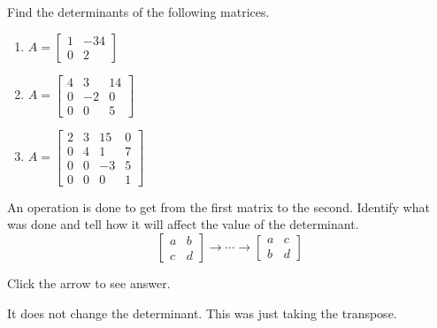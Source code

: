 \documentclass{ximera}
\begin{document}
\begin{problem}\label{prb:7.8} Find the determinants of the following matrices.

\begin{enumerate}
\item
$A = \left[ \begin{array}{rr}
1 & -34 \\
0 & 2
\end{array} \right] $

\item
$A = \left[ \begin{array}{rrr}
4 & 3 & 14 \\
 0 & -2 & 0 \\
0 & 0 & 5
\end{array} \right]$

\item
$A = \left[ \begin{array}{rrrr}
2 & 3 & 15 & 0 \\
0 & 4 & 1 & 7 \\
0 & 0 & -3 & 5 \\
0 & 0 & 0 & 1
\end{array} \right]$
\end{enumerate}


\end{problem}

\begin{problem}\label{prb:7.9} An operation is done to get from the first matrix to the second.
Identify what was done and tell how it will affect the value of the
determinant.
\begin{equation*}
\left[
\begin{array}{cc}
a & b \\
c & d
\end{array}
\right]  \rightarrow \cdots \rightarrow \left[
\begin{array}{cc}
a & c \\
b & d
\end{array}
\right]
\end{equation*}

Click the arrow to see answer.
\begin{expandable}
It does not change the determinant. This was just taking the transpose.
\end{expandable}
\end{problem}
\end{document}
